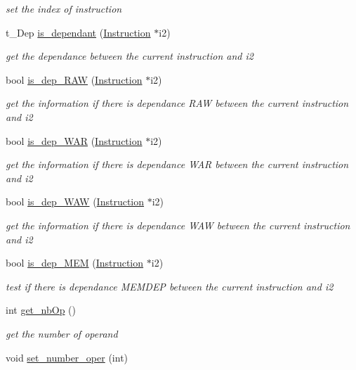 \begin{DoxyCompactItemize}
\begin{DoxyCompactList}\small\item\em set the index of instruction \end{DoxyCompactList}\item 
t\+\_\+\+Dep \hyperlink{class_instruction_ac8d86b800140a08cb03d82f83f363fa4}{is\+\_\+dependant} (\hyperlink{class_instruction}{Instruction} $\ast$i2)
\begin{DoxyCompactList}\small\item\em get the dependance between the current instruction and i2 \end{DoxyCompactList}\item 
bool \hyperlink{class_instruction_a4c902c5a8fdc8c8841ec24f389605fd5}{is\+\_\+dep\+\_\+\+R\+A\+W} (\hyperlink{class_instruction}{Instruction} $\ast$i2)
\begin{DoxyCompactList}\small\item\em get the information if there is dependance R\+A\+W between the current instruction and i2 \end{DoxyCompactList}\item 
bool \hyperlink{class_instruction_ae79b239c6ab30a15064b5a00944ad65a}{is\+\_\+dep\+\_\+\+W\+A\+R} (\hyperlink{class_instruction}{Instruction} $\ast$i2)
\begin{DoxyCompactList}\small\item\em get the information if there is dependance W\+A\+R between the current instruction and i2 \end{DoxyCompactList}\item 
bool \hyperlink{class_instruction_a30c159faa5c462bb2c7ae7562c9c8254}{is\+\_\+dep\+\_\+\+W\+A\+W} (\hyperlink{class_instruction}{Instruction} $\ast$i2)
\begin{DoxyCompactList}\small\item\em get the information if there is dependance W\+A\+W between the current instruction and i2 \end{DoxyCompactList}\item 
bool \hyperlink{class_instruction_a28526bda91b964d7fd81f85cee02c624}{is\+\_\+dep\+\_\+\+M\+E\+M} (\hyperlink{class_instruction}{Instruction} $\ast$i2)
\begin{DoxyCompactList}\small\item\em test if there is dependance M\+E\+M\+D\+E\+P between the current instruction and i2 \end{DoxyCompactList}\item 
int \hyperlink{class_instruction_a044a281355f25375a7765f24bdf614f3}{get\+\_\+nb\+Op} ()
\begin{DoxyCompactList}\small\item\em get the number of operand \end{DoxyCompactList}\item 
\hypertarget{class_instruction_a6ff2d531dffa43d3db22194459336d33}{}void \hyperlink{class_instruction_a6ff2d531dffa43d3db22194459336d33}{set\+\_\+number\+\_\+oper} (int)\label{class_instruction_a6ff2d531dffa43d3db22194459336d33}


\end{DoxyCompactItemize}
